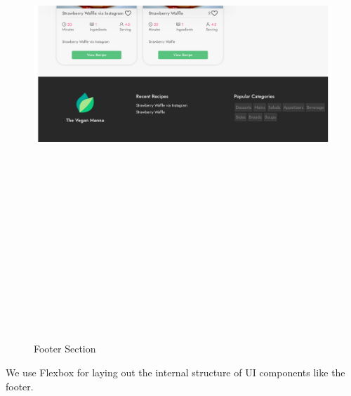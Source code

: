 \begin{figure}[!hb]
\centering
\caption[Footer Section]{Footer Section}%
\label{fig:footer_section}
\includegraphics[width=\linewidth,height=20cm,keepaspectratio]{img/footer_section}
\end{figure}

We use Flexbox for laying out the internal structure of UI components like the footer. 

